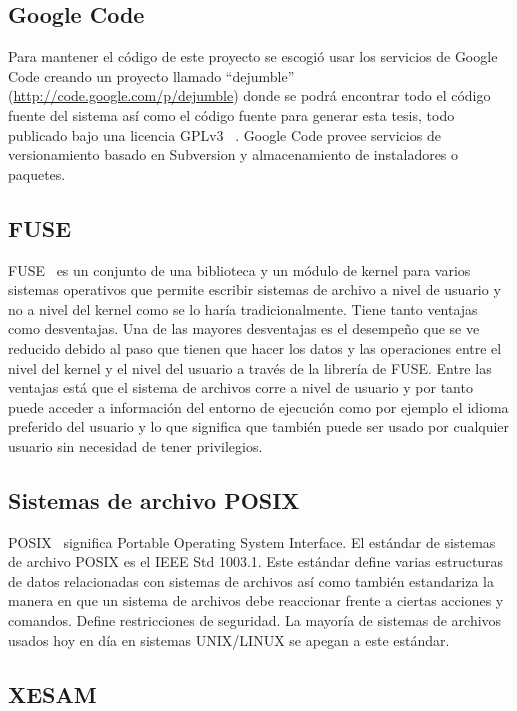 \subsection{Google Code}

Para mantener el código de este proyecto se escogió usar los servicios de Google Code creando un proyecto llamado ``dejumble'' (\url{http://code.google.com/p/dejumble}) donde se podrá encontrar todo el código fuente del sistema así como el código fuente para generar esta tesis, todo publicado bajo una licencia GPLv3 ~\cite{gpl:website}. Google Code provee servicios de versionamiento basado en Subversion y almacenamiento de instaladores o paquetes. 


\subsection{FUSE}

FUSE~\cite{fuse:website} es un conjunto de una biblioteca y un módulo de kernel para varios sistemas operativos que permite escribir sistemas de archivo a nivel de usuario y no a nivel del kernel como se lo haría tradicionalmente. Tiene tanto ventajas como desventajas. Una de las mayores desventajas es el desempeño que se ve reducido debido al paso que tienen que hacer los datos y las operaciones entre el nivel del kernel y el nivel del usuario a través de la librería de FUSE. Entre las ventajas está que el sistema de archivos corre a nivel de usuario y por tanto puede acceder a información del entorno de ejecución como por ejemplo el idioma preferido del usuario y lo que significa que también puede ser usado por cualquier usuario sin necesidad de tener privilegios.

\subsection{Sistemas de archivo POSIX}

POSIX~\cite{posix:website} significa Portable Operating System Interface. El estándar de sistemas de archivo POSIX es el IEEE Std 1003.1. Este estándar define varias estructuras de datos relacionadas con sistemas de archivos así como también estandariza la manera en que un sistema de archivos debe reaccionar frente a ciertas acciones y comandos. Define restricciones de seguridad. La mayoría de sistemas de archivos usados hoy en día en sistemas UNIX/LINUX se apegan a este estándar.

\subsection{XESAM}

